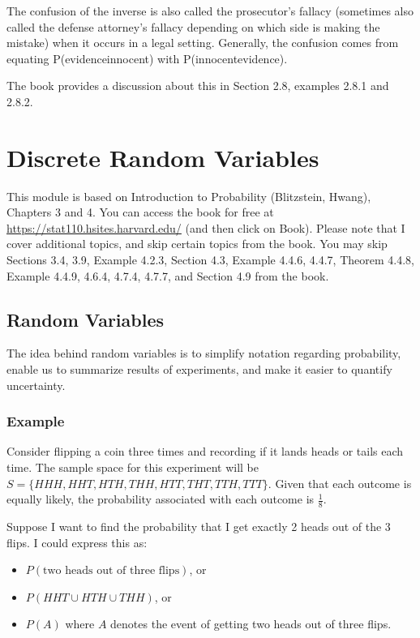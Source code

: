 \documentclass[
]{book}
\providecommand{\tightlist}{%
  \setlength{\itemsep}{0pt}\setlength{\parskip}{0pt}}
\begin{document}
The confusion of the inverse is also called the prosecutor's fallacy (sometimes also called the defense attorney's fallacy depending on which side is making the mistake) when it occurs in a legal setting. Generally, the confusion comes from equating P(evidence\textbar innocent) with P(innocent\textbar evidence).

The book provides a discussion about this in Section 2.8, examples 2.8.1 and 2.8.2.

\hypertarget{discrete-random-variables}{%
\chapter{Discrete Random Variables}\label{discrete-random-variables}}

This module is based on Introduction to Probability (Blitzstein, Hwang), Chapters 3 and 4. You can access the book for free at \url{https://stat110.hsites.harvard.edu/} (and then click on Book). Please note that I cover additional topics, and skip certain topics from the book. You may skip Sections 3.4, 3.9, Example 4.2.3, Section 4.3, Example 4.4.6, 4.4.7, Theorem 4.4.8, Example 4.4.9, 4.6.4, 4.7.4, 4.7.7, and Section 4.9 from the book.

\hypertarget{random-variables}{%
\section{Random Variables}\label{random-variables}}

The idea behind random variables is to simplify notation regarding probability, enable us to summarize results of experiments, and make it easier to quantify uncertainty.

\hypertarget{example}{%
\subsection{Example}\label{example}}

Consider flipping a coin three times and recording if it lands heads or tails each time. The sample space for this experiment will be \(S = \{HHH, HHT, HTH, THH, HTT, THT, TTH, TTT\}\). Given that each outcome is equally likely, the probability associated with each outcome is \(\frac{1}{8}\).

Suppose I want to find the probability that I get exactly 2 heads out of the 3 flips. I could express this as:

\begin{itemize}
\tightlist
\item
  \(P(\text{two heads out of three flips})\), or
\item
  \(P(HHT \cup HTH \cup THH)\), or
\item
  \(P(A)\) where \(A\) denotes the event of getting two heads out of three flips.
\end{itemize}
\end{document}
